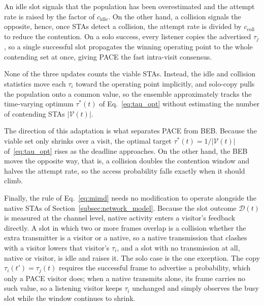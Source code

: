 \documentclass[conference]{IEEEtran}
\begin{document}
An idle slot signals that the
population has been overestimated and the attempt rate is raised by the factor of $c_\mathrm{idle}$. On the other hand, a collision signals the opposite, hence, once STAs detect a collision, the attempt rate is divided by $c_\mathrm{coll}$ to reduce the contention. On a solo success, every listener copies the advertised $\tau_j$, so a single successful slot propagates the winning operating point to the whole contending set at once, giving PACE the fast intra-visit consensus.

None of the three updates counts the viable STAs. Instead, the idle and collision statistics move each $\tau_i$ toward the operating point implicitly, and solo-copy pulls the population onto a common value, so the ensemble approximately tracks the time-varying optimum $\tau^*(t)$ of Eq.~\eqref{eq:tau_opt} without estimating the number of contending STAs $|\mathcal{V}(t)|$. 

The direction of this adaptation is what separates PACE from BEB. Because the viable set only shrinks over a visit, the optimal target $\tau^*(t)=1/|\mathcal{V}(t)|$ of~\eqref{eq:tau_opt} rises as the deadline approaches. On the other hand, the BEB moves the opposite way, that is, a collision doubles the contention window and halves the attempt rate, so the access probability falls exactly when it should climb.

Finally, the rule of Eq.~\eqref{eq:mimd} needs no modification to operate alongside the native STAs of Section~\ref{subsec:network_model}. Because the slot outcome $\mathcal{D}(t)$ is measured at the channel level, native activity enters a visitor's feedback directly. A slot in which two or more frames overlap is a collision whether the extra transmitter is a visitor or a native, so a native transmission that clashes with a visitor lowers that visitor's $\tau_i$, and a slot with no transmission at all, native or visitor, is idle and raises it. The solo case is the one exception. The copy $\tau_i(t') = \tau_j(t)$ requires the successful frame to advertise a probability, which only a PACE visitor does; when a native transmits alone, its frame carries no such value, so a listening visitor keeps $\tau_i$ unchanged and simply observes the busy slot while the window continues to shrink.

\end{document}
